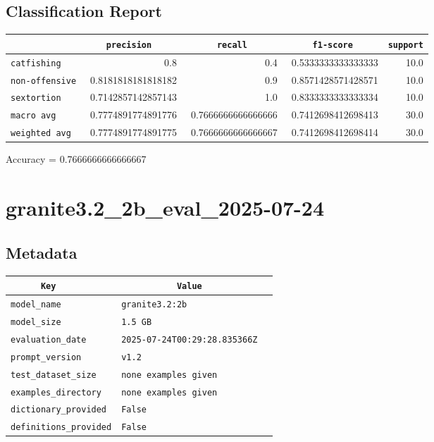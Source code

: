 \documentclass{article}
\begin{document}
\subsection{Classification Report}

\begin{center}
\begin{tabular}{l | r | r | r | r} \hline
    \verb|            | & \verb|    precision     | & \verb|      recall      | & \verb|     f1-score     | & \verb|support| \\ \hline
    \hline
    \verb|catfishing | & 0.8 & 0.4 & 0.5333333333333333 &    10.0 \\ \hline
    \verb|non-offensive| & 0.8181818181818182 & 0.9 & 0.8571428571428571 &    10.0 \\ \hline
    \verb|sextortion | & 0.7142857142857143 & 1.0 & 0.8333333333333334 &    10.0 \\ \hline
    \verb|macro avg  | & 0.7774891774891776 & 0.7666666666666666 & 0.7412698412698413 &    30.0 \\ \hline
    \verb|weighted avg| & 0.7774891774891775 & 0.7666666666666667 & 0.7412698412698414 &    30.0 \\ \hline
\end{tabular}
\end{center}

\begin{center}
Accuracy = 0.7666666666666667
\end{center}

\section{granite3.2\_2b\_eval\_2025-07-24}
\subsection{Metadata}

\begin{center}
\begin{tabular}{l | l} \hline
    \verb|      Key      | & \verb|           Value           | \\ \hline
    \hline
    \verb|model_name    | & \verb|granite3.2:2b                | \\ \hline
    \verb|model_size    | & \verb|1.5 GB                       | \\ \hline
    \verb|evaluation_date| & \verb|2025-07-24T00:29:28.835366Z  | \\ \hline
    \verb|prompt_version| & \verb|v1.2                         | \\ \hline
    \verb|test_dataset_size| & \verb|none examples given          | \\ \hline
    \verb|examples_directory| & \verb|none examples given          | \\ \hline
    \verb|dictionary_provided| & \verb|False                        | \\ \hline
    \verb|definitions_provided| & \verb|False                        | \\ \hline
\end{tabular}
\end{center}
\end{document}
